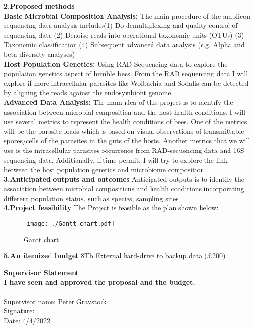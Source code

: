 \documentclass[11pt,a4paper]{article}
\begin{document}
\textbf{2.Proposed methods}\\
\textbf{Basic Microbial Composition Analysis:}
 The main procedure of the amplicon sequencing data analysis includes(1) Do demultiplexing and quality control of sequencing data (2) Denoise reads into operational taxonomic units (OTUs) (3) Taxonomic classification (4) Subsequent advanced data analysis (e.g. Alpha and beta diversity analyses) \\
\textbf{Host Population Genetics:}
Using RAD-Sequencing data to explore the population genetics aspect of humble bees. From the RAD sequencing data I will explore if more intracellular parasites like Wolbachia and Sodalis can be detected by aligning the reads against the endosymbiont genome.\\
\textbf{Advanced Data Analysis:} The main idea of this project is to identify the association between microbial composition and the host health conditions. I will use several metrics to represent the health conditions of bees. One of the metrics will be the parasite loads which is based on visual observations of transmittable spores/cells of the parasites in the guts of the hosts. Another metrics that we will use is the intracellular parasites occurrence from RAD-sequencing data and 16S sequencing data. Additionally, if time permit, I will try to explore the link between the host population genetics and microbiome composition\\
\textbf{3.Anticipated outputs and outcomes}
Anticipated outputs is to identify the association between microbial compositions and health conditions incorporating different population status, such as species, sampling sites\\
\textbf{4.Project feasibility}
The Project is feasible as the plan shown below:

\begin{figure}[H]
    \centering
    \texttt{[image: ./Gantt\_chart.pdf]}
    \caption{Gantt chart}
\end{figure}

\noindent\textbf{5.An itemized budget}
8Tb External hard-drive to backup data (£200)


\newpage
  



\newpage

\noindent\textbf{Supervisor Statement} \\


\noindent\textbf{I have seen and approved the proposal and the budget.} \\
\\
Supervisor name: Peter Graystock\\
Signature: \\




\noindent Date: 4/4/2022\\
\end{document}
